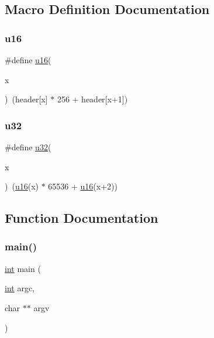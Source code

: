 \subsection{Macro Definition Documentation}
\mbox{\label{checksum-icc_8c_a5b2d6d159390c8e74c4adec23fafa19e}} 
\subsubsection{\texorpdfstring{u16}{u16}}
{\footnotesize\ttfamily \#define \mbox{\hyperlink{sqlite3_8c_a20f2299e322dcbde37cb07b16910b843}{u16}}(\begin{DoxyParamCaption}\item[{}]{x }\end{DoxyParamCaption})~(header\mbox{[}x\mbox{]} $\ast$ 256 + header\mbox{[}x+1\mbox{]})}

\mbox{\label{checksum-icc_8c_a296308971cf8c20a6557781461fc4982}} 
\subsubsection{\texorpdfstring{u32}{u32}}
{\footnotesize\ttfamily \#define \mbox{\hyperlink{sqlite3_8c_a03ad5adfaeb9b7640dde78a0cc390319}{u32}}(\begin{DoxyParamCaption}\item[{}]{x }\end{DoxyParamCaption})~(\mbox{\hyperlink{sqlite3_8c_a20f2299e322dcbde37cb07b16910b843}{u16}}(x) $\ast$ 65536 + \mbox{\hyperlink{sqlite3_8c_a20f2299e322dcbde37cb07b16910b843}{u16}}(x+2))}



\subsection{Function Documentation}
\mbox{\label{checksum-icc_8c_a3c04138a5bfe5d72780bb7e82a18e627}} 
\subsubsection{\texorpdfstring{main()}{main()}}
{\footnotesize\ttfamily \mbox{\hyperlink{ioapi_8h_a787fa3cf048117ba7123753c1e74fcd6}{int}} main (\begin{DoxyParamCaption}\item[{\mbox{\hyperlink{ioapi_8h_a787fa3cf048117ba7123753c1e74fcd6}{int}}}]{argc,  }\item[{char $\ast$$\ast$}]{argv }\end{DoxyParamCaption})}

